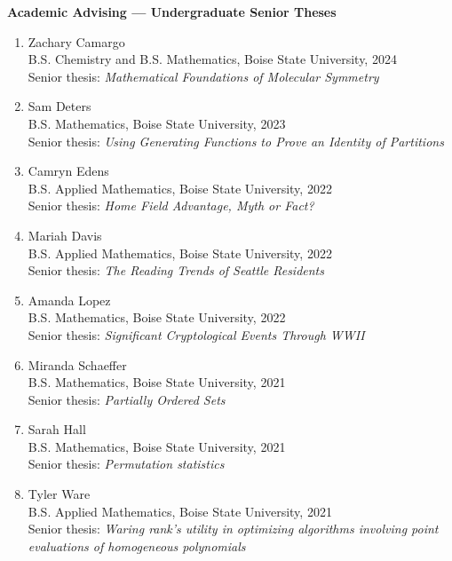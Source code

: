 \documentclass[12pt]{article}
\begin{document}
\textbf{Academic Advising --- Undergraduate Senior Theses}
\begin{enumerate}[revarabic,labelwidth=*]

\item Zachary Camargo \\
B.S. Chemistry and B.S. Mathematics, Boise State University, 2024 \\
Senior thesis: \emph{Mathematical Foundations of Molecular Symmetry}

\item Sam Deters \\
B.S. Mathematics, Boise State University, 2023 \\
Senior thesis: \emph{Using Generating Functions to Prove an Identity of Partitions}

\item Camryn Edens \\
B.S. Applied Mathematics, Boise State University, 2022 \\
Senior thesis: \emph{Home Field Advantage, Myth or Fact?}

\item Mariah Davis \\
B.S. Applied Mathematics, Boise State University, 2022 \\
Senior thesis: \emph{The Reading Trends of Seattle Residents}

\item Amanda Lopez \\
B.S. Mathematics, Boise State University, 2022 \\
Senior thesis: \emph{Significant Cryptological Events Through WWII}

\item Miranda Schaeffer \\
B.S. Mathematics, Boise State University, 2021 \\
Senior thesis: \emph{Partially Ordered Sets}

\item Sarah Hall \\
B.S. Mathematics, Boise State University, 2021 \\
Senior thesis: \emph{Permutation statistics}

\item Tyler Ware \\
B.S. Applied Mathematics, Boise State University, 2021 \\
Senior thesis: \emph{Waring rank's utility in optimizing algorithms
involving point evaluations of homogeneous polynomials}


\end{enumerate}
\end{document}

